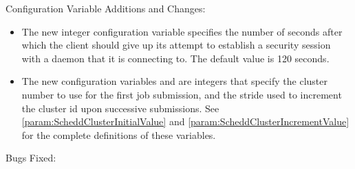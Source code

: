 \noindent Configuration Variable Additions and Changes:

\begin{itemize}

\item The new integer configuration variable
   specifies the
  number of seconds after which the client should give up its attempt to
  establish a security session with a daemon that it is connecting to.
  The default value is 120 seconds.

\item The new configuration variables 
  and  are integers that 
  specify the cluster number to use for the first job submission,
  and the stride used to increment the cluster id upon successive submissions.
  See \ref{param:ScheddClusterInitialValue} and
  \ref{param:ScheddClusterIncrementValue}
  for the complete definitions of these variables.

\end{itemize}

\noindent Bugs Fixed:

